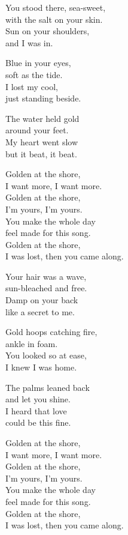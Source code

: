 \begin{lyrics}
You stood there, sea-sweet,\\
with the salt on your skin.\\
Sun on your shoulders,\\
and I was in.

Blue in your eyes,\\
soft as the tide.\\
I lost my cool,\\
just standing beside.

The water held gold\\
around your feet.\\
My heart went slow\\
but it beat, it beat.

Golden at the shore,\\
I want more, I want more.\\
Golden at the shore,\\
I’m yours, I’m yours.\\
You make the whole day\\
feel made for this song.\\
Golden at the shore,\\
I was lost, then you came along.

Your hair was a wave,\\
sun-bleached and free.\\
Damp on your back\\
like a secret to me.

Gold hoops catching fire,\\
ankle in foam.\\
You looked so at ease,\\
I knew I was home.

The palms leaned back\\
and let you shine.\\
I heard that love\\
could be this fine.

Golden at the shore,\\
I want more, I want more.\\
Golden at the shore,\\
I’m yours, I’m yours.\\
You make the whole day\\
feel made for this song.\\
Golden at the shore,\\
I was lost, then you came along.


\end{lyrics}
